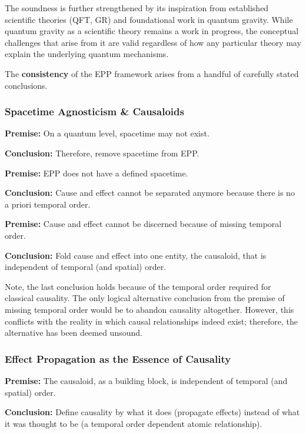 The soundness is further strengthened by its inspiration from established scientific theories (QFT, GR) and foundational work in quantum gravity. While quantum gravity as a scientific theory remains a work in progress, the conceptual challenges that arise from it are valid regardless of how any particular theory may explain the underlying quantum mechanisms.

\newpage

The \textbf{consistency} of the EPP framework arises from a handful of carefully stated conclusions.

\subsubsection{Spacetime Agnosticism \& Causaloids}

\textbf{Premise:} On a quantum level, spacetime may not exist.

\textbf{Conclusion:} Therefore, remove spacetime from EPP.

\textbf{Premise:} EPP does not have a defined spacetime.

\textbf{Conclusion:} Cause and effect cannot be separated anymore because there is no a priori temporal order.

\textbf{Premise:} Cause and effect cannot be discerned because of missing temporal order.

\textbf{Conclusion:} Fold cause and effect into one entity, the causaloid, that is independent of temporal (and spatial) order.

Note, the last conclusion holds because of the temporal order required for classical causality. The only logical alternative conclusion from the premise of missing temporal order would be to abandon causality altogether. However, this conflicts with the reality in which causal relationships indeed exist; therefore, the alternative has been deemed unsound.

\subsubsection{Effect Propagation as the Essence of Causality}

\textbf{Premise:} The causaloid, as a building block, is independent of temporal (and spatial) order.

\textbf{Conclusion:} Define causality by what it does (propagate effects) instead of what it was thought to be (a temporal order dependent atomic relationship).

